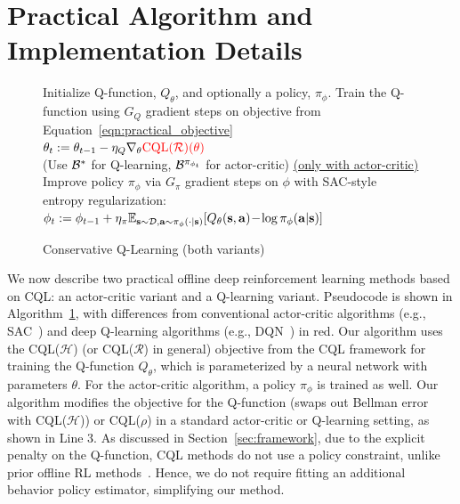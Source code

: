 \section{Practical Algorithm and Implementation Details}
\label{sec:practical_alg}
\vspace{-7pt}
\begin{figure}
\begin{small}
\vspace{-24pt}
\begin{minipage}[t]{0.99\linewidth}
\begin{algorithm}[H]
\small
\caption{Conservative Q-Learning (both variants)}
\label{alg:practical_alg}
\begin{algorithmic}[1]
    \STATE Initialize Q-function, $Q_\theta$, and optionally a policy, $\pi_\phi$.
        \STATE Train the Q-function using $G_Q$ gradient steps on objective from Equation~\ref{eqn:practical_objective} \\
        \mbox{$\theta_t := \theta_{t-1} - \eta_Q \nabla_\theta \textcolor{red}{\text{CQL}(\mathcal{R})(\theta)}$}\\
        (Use $\mathcal{B}^*$ for Q-learning, $\mathcal{B}^{\pi_{\phi_t}}$ for actor-critic)
        \STATE \underline{(only with actor-critic)} Improve policy $\pi_\phi$ via $G_\pi$ gradient steps on $\phi$ with SAC-style entropy regularization:\\
        \mbox{$\phi_{t} := \phi_{t-1} + \eta_\pi \mathbb{E}_{\mathbf{s} \sim \mathcal{D}, \mathbf{a} \sim \pi_\phi(\cdot|\mathbf{s})}[Q_\theta(\mathbf{s}, \mathbf{a})\! -\! \log \pi_\phi(\mathbf{a}|\mathbf{s})] $}
    \ENDFOR
\end{algorithmic}
\end{algorithm}
\end{minipage}
\vspace{-14pt}
\end{small}
\end{figure}
We now describe two practical offline deep reinforcement learning methods based on CQL: an actor-critic variant and a Q-learning variant. Pseudocode is shown in Algorithm~\ref{alg:practical_alg}, with differences from conventional actor-critic algorithms (e.g., SAC~\citep{haarnoja}) and deep Q-learning algorithms (e.g., DQN~\citep{mnih2013playing}) in red.
Our algorithm uses the CQL($\mathcal{H}$) (or CQL($\mathcal{R}$) in general) objective from the CQL framework for training the Q-function $Q_\theta$, which is parameterized by a neural network with parameters $\theta$. For the actor-critic algorithm, a policy $\pi_\phi$ is trained as well. Our algorithm modifies the objective for the Q-function (swaps out Bellman error with CQL($\mathcal{H}$)) or CQL($\rho$)
in a standard actor-critic or Q-learning setting, as shown in Line 3. As discussed in Section~\ref{sec:framework}, due to the explicit penalty on the Q-function, CQL methods do not use a policy constraint,
unlike prior offline RL methods~\citep{kumar2019stabilizing,wu2019behavior,siegel2020keep,levine2020offline}.
Hence, we do not require fitting an additional behavior policy estimator, simplifying our method. %

